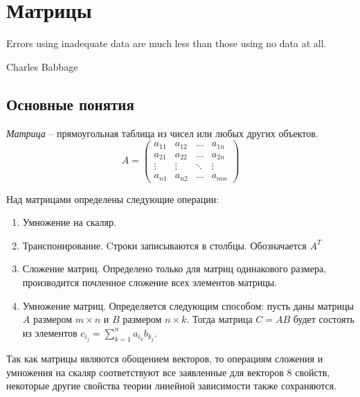 \section{Матрицы}
\label{matrix}

\epigraph{Errors using inadequate data are much less than those using
  no data at all.}{Charles Babbage}

\subsection{Основные понятия}

\begin{df}
  \emph{Матрица} -- прямоугольная таблица из чисел или любых других объектов.
  $$
  A =
  \begin{pmatrix}
   a_{11}&a_{12}&\dots&a_{1n}\\
   a_{21}&a_{22}&\dots&a_{2n}\\
   \vdots&\vdots&\ddots&\vdots\\
   a_{n1}&a_{n2}&\dots&a_{mn}
  \end{pmatrix}
  $$
\end{df}

Над матрицами определены следующие операции:
\begin{enumerate}
\item Умножение на скаляр.
\item Транспонирование. Cтроки
  записываются в столбцы. Обозначается $A^T$
\item Сложение матриц. Определено только для матриц одинакового
  размера, производится почленное сложение всех элементов матрицы.
\item Умножение матриц. Определяется следующим способом: пусть даны
  матрицы $A$ размером $m\times n$ и $B$ размером $n\times k$. Тогда
  матрица $C=AB$ будет состоять из элементов
  $c_{i_j}=\sum\limits_{k=1}^n a_{i_k}b_{k_j}$. 
\end{enumerate}
  
Так как матрицы являются обощением векторов, то операциям сложения и
умножения на скаляр соответствуют все заявленные для векторов 8
свойств, некоторые другие свойства теории линейной зависимости также
сохраняются.
  
